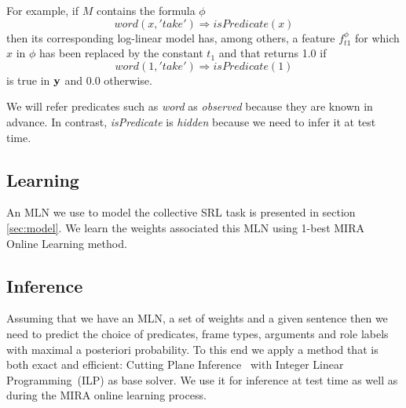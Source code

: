 For example, if $M$ contains the formula $\phi$ \[
word\left(x,'take'\right)\Rightarrow isPredicate\left(x\right)\]
then its corresponding log-linear model has, among others, a feature 
$f_{t1}^{\phi}$ for which $x$ in $\phi$ has been replaced by the constant $t_1$ and that returns 1.0 if \[
word\left(1,'take'\right)\Rightarrow isPredicate\left(1\right)\]
is true in $\mathbf{y}$ and 0.0 otherwise.

We will refer predicates such as \emph{word} as \emph{observed} because they are known in advance. In contrast, \emph{isPredicate} is \emph{hidden} because we need to infer it at test time.

\subsection{Learning}

An MLN we use to model the collective SRL task is presented in section \ref{sec:model}. We learn the weights associated this MLN using 1-best MIRA~\citep{crammer01ultraconservative} Online Learning method. %

\subsection{Inference}


Assuming that we have an MLN, a set of weights and a given sentence then we need to predict the choice of predicates, frame types, arguments and role labels with maximal a posteriori probability. To this end we apply a method that is both exact and efficient: Cutting Plane Inference~\citep[CPI,][]{riedel08improving} with Integer Linear Programming~(ILP) as base solver. We use it for inference at test time as well as during the MIRA online learning process.

